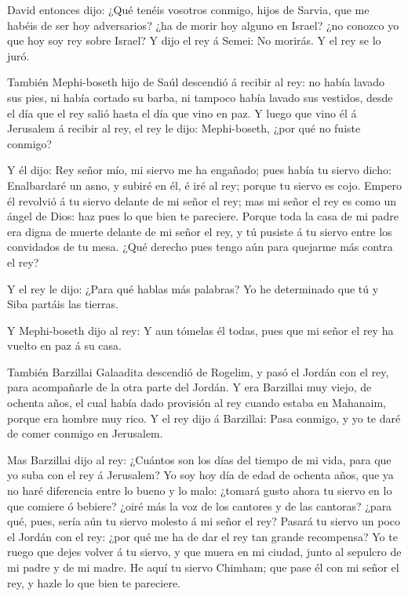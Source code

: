  David entonces dijo: ¿Qué tenéis vosotros conmigo, hijos
de Sarvia, que me habéis de ser hoy adversarios? ¿ha de morir hoy alguno
en Israel? ¿no conozco yo que hoy soy rey sobre Israel?  Y
dijo el rey á Semei: No morirás. Y el rey se lo juró.

 También Mephi-boseth hijo de Saúl descendió á recibir al
rey: no había lavado sus pies, ni había cortado su barba, ni tampoco
había lavado sus vestidos, desde el día que el rey salió hasta el día
que vino en paz.  Y luego que vino él á Jerusalem á recibir
al rey, el rey le dijo: Mephi-boseth, ¿por qué no fuiste conmigo?

 Y él dijo: Rey señor mío, mi siervo me ha engañado; pues
había tu siervo dicho: Enalbardaré un asno, y subiré en él, é iré al
rey; porque tu siervo es cojo.  Empero él revolvió á tu
siervo delante de mi señor el rey; mas mi señor el rey es como un ángel
de Dios: haz pues lo que bien te pareciere.  Porque toda la
casa de mi padre era digna de muerte delante de mi señor el rey, y tú
pusiste á tu siervo entre los convidados de tu mesa. ¿Qué derecho pues
tengo aún para quejarme más contra el rey?

 Y el rey le dijo: ¿Para qué hablas más palabras? Yo he
determinado que tú y Siba partáis las tierras.

 Y Mephi-boseth dijo al rey: Y aun tómelas él todas, pues
que mi señor el rey ha vuelto en paz á su casa.

 También Barzillai Galaadita descendió de Rogelim, y pasó
el Jordán con el rey, para acompañarle de la otra parte del Jordán.
 Y era Barzillai muy viejo, de ochenta años, el cual había
dado provisión al rey cuando estaba en Mahanaim, porque era hombre muy
rico.  Y el rey dijo á Barzillai: Pasa conmigo, y yo te
daré de comer conmigo en Jerusalem.

 Mas Barzillai dijo al rey: ¿Cuántos son los días del
tiempo de mi vida, para que yo suba con el rey á Jerusalem?
 Yo soy hoy día de edad de ochenta años, que ya no haré
diferencia entre lo bueno y lo malo: ¿tomará gusto ahora tu siervo en lo
que comiere ó bebiere? ¿oiré más la voz de los cantores y de las
cantoras? ¿para qué, pues, sería aún tu siervo molesto á mi señor el
rey?  Pasará tu siervo un poco el Jordán con el rey: ¿por
qué me ha de dar el rey tan grande recompensa?  Yo te ruego
que dejes volver á tu siervo, y que muera en mi ciudad, junto al
sepulcro de mi padre y de mi madre. He aquí tu siervo Chimham; que pase
él con mi señor el rey, y hazle lo que bien te pareciere.

